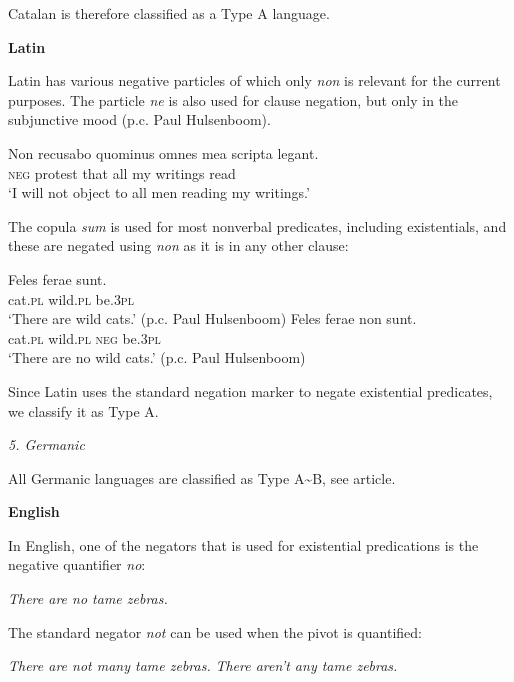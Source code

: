 ﻿\documentclass[output=paper]{langsci/langscibook}
\begin{document}
\begin{unindented}
Catalan is therefore classified as a Type A language. 

\textbf{Latin}

Latin has various negative particles \parencite[129]{GreenoughKittredge1903} of which only \textit{non} is relevant for the current purposes. The particle \textit{ne} is also used for clause negation, but only in the subjunctive mood (p.c. Paul Hulsenboom).
%
\begin{exe}\ex \gll Non recusabo quominus omnes mea scripta   legant. \\
\textsc{neg} protest that all my writings read \\
    \glt `I will not object to all men reading my writings.'
\textcite[145]{Roby1862}
    \end{exe}

The copula \textit{sum} is used for most nonverbal predicates, including existentials, and these are negated using \textit{non} as it is in any other clause:
%
\begin{exe}\ex \gll Feles  ferae    sunt. \\
cat.\textsc{pl} wild.\textsc{pl} be.\textsc{3pl} \\
    \glt `There are wild cats.' (p.c. Paul Hulsenboom)
\ex \gll Feles  ferae non sunt. \\
cat.\textsc{pl} wild.\textsc{pl} \textsc{neg} be.\textsc{3pl} \\
    \glt `There are no wild cats.' (p.c. Paul Hulsenboom)
    \end{exe}

Since Latin uses the standard negation marker to negate existential predicates, we classify it as Type A. 

\textit{5. Germanic}

All Germanic languages are classified as Type A{\textasciitilde}B, see article.

\textbf{English}

In English, one of the negators that is used for existential predications is the negative quantifier \textit{no}: 
%
\begin{exe}\ex \textit{There are no tame zebras.}
    \end{exe}

The standard negator \textit{not} can be used when the pivot is quantified:
%
\begin{exe}\ex \begin{xlist}
\ex \textit{There are not many tame zebras.}
\ex \textit{There aren’t any tame zebras.}
    \end{xlist}\end{exe}


\end{unindented}
\end{document}
